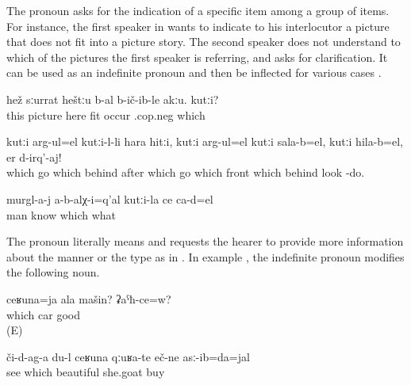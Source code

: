 The pronoun  asks for the indication of a specific item among a group of items. For instance, the first speaker in  wants to indicate to his interlocutor a picture that does not fit into a picture story. The second speaker does not understand to which of the pictures the first speaker is referring, and asks for clarification. It can be used as an indefinite pronoun and then be inflected for various cases .
%
\begin{exe}
	\ex	\label{ex:This picture does not fit here. Which}
	\gll	hež	sːurrat	heštːu	b-al	b-ič-ib-le	akːu. kutːi?\\
		this	picture	here	\tsc{n-}fit	occur	\tsc.{cop.neg}	which\\
	\glt	{}

	\ex	\label{ex:Which (picture) goes behind which, which goes in front, which goes behind, take a look}
	\gll	kutːi	arg-ul=el	kutːi-l-li	hara	hitːi,	kutːi	arg-ul=el kutːi	sala-b=el,	kutːi	hila-b=el,		er d-irq'-aj!\\
		which	go	which	behind	after	which	go	which	front\tsc{-n=indq}		which	behind		look -do.\\
	\glt	{}

	\ex	\label{ex:The men did not know which was whose}
	\gll	murgl-a-j	a-b-alχ-i=q'al	kutːi-la	ce	ca-d=el\\
		man	know	which	what	\\
	\glt	{}
\end{exe}

The pronoun  literally means  and requests the hearer to provide more information about the manner or the type as in . In example , the indefinite pronoun modifies the following noun.
%
\begin{exe}
	\ex	\label{ex:How is your car? Is it good?}
	\gll	ceʁuna=ja	ala	mašin?		ʡaˁħ-ce=w?\\
		which		car	good\\
	\glt	{} (E)

	\ex	\label{ex:Look what beautiful goats I bought}
	\gll	či-d-ag-a	du-l	ceʁuna	qːuʁa-te	eč-ne	asː-ib=da=jal\\
		see		which	beautiful 	she.goat	buy\\
	\glt	{}
\end{exe}


